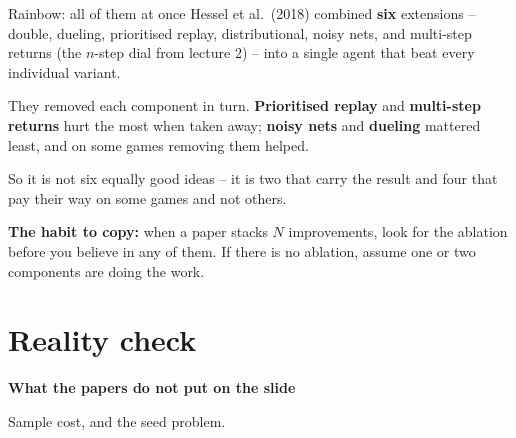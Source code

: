 \documentclass[aspectratio=169]{beamer}
\begin{document}
\begin{frame}{Rainbow: all of them at once}
  \small
  Hessel et al.\ (2018) combined \textbf{six} extensions -- double, dueling, prioritised replay,
  distributional, noisy nets, and multi-step returns (the $n$-step dial from lecture 2) -- into a
  single agent that beat every individual variant.

  \vskip 8pt
  \begin{tcolorbox}[colback=armblue!8, colframe=armblue, boxrule=0.6pt, arc=2pt,
                    title={\textbf{The part worth remembering is the ablation}}]
    \small
    They removed each component in turn. \textbf{Prioritised replay} and \textbf{multi-step
    returns} hurt the most when taken away; \textbf{noisy nets} and \textbf{dueling} mattered
    least, and on some games removing them helped.

    \vskip 4pt
    So it is not six equally good ideas -- it is two that carry the result and four that pay
    their way on some games and not others.
  \end{tcolorbox}

  \vskip 8pt
  \begin{tcolorbox}[colback=paramgreen!8, colframe=paramgreen, boxrule=0.6pt, arc=2pt]
    \small
    \textbf{The habit to copy:} when a paper stacks $N$ improvements, look for the ablation
    before you believe in any of them. If there is no ablation, assume one or two components
    are doing the work.
  \end{tcolorbox}
\end{frame}

\section{Reality check}
\begin{frame}[plain]
  \begin{center}
    \vskip 1.6cm
    {\Huge\bfseries\color{popblue}What the papers do not put on the slide}

    \vskip 0.6cm
    {\large Sample cost, and the seed problem.}
  \end{center}
\end{frame}
\end{document}
